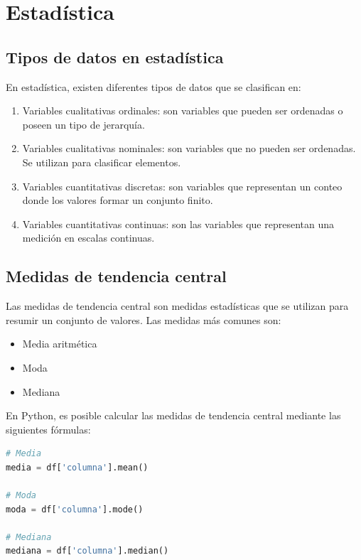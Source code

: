 \documentclass[a4paper, 12pt]{book}
\begin{document}
\section{Estadística}
\subsection{Tipos de datos en estadística}
En estadística, existen diferentes tipos de datos que se clasifican en:
\begin{enumerate}
	\item Variables cualitativas ordinales: son variables que pueden ser ordenadas o poseen un tipo de jerarquía.
	\item Variables cualitativas nominales: son variables que no pueden ser ordenadas. Se utilizan para clasificar elementos.
	\item Variables cuantitativas discretas: son variables que representan un conteo donde los valores formar un conjunto finito.
	\item Variables cuantitativas continuas: son las variables que representan una medición en escalas continuas.
\end{enumerate}

\subsection{Medidas de tendencia central}
Las medidas de tendencia central son medidas estadísticas que se utilizan para resumir un conjunto de valores. Las medidas más comunes son:

\begin{itemize}
	\item Media aritmética
	\item Moda
	\item Mediana
\end{itemize}

En Python, es posible calcular las medidas de tendencia central mediante las siguientes fórmulas:
\begin{lstlisting}[language=Python]
# Media
media = df['columna'].mean()

# Moda
moda = df['columna'].mode()

# Mediana
mediana = df['columna'].median()
\end{lstlisting}

\end{document}
